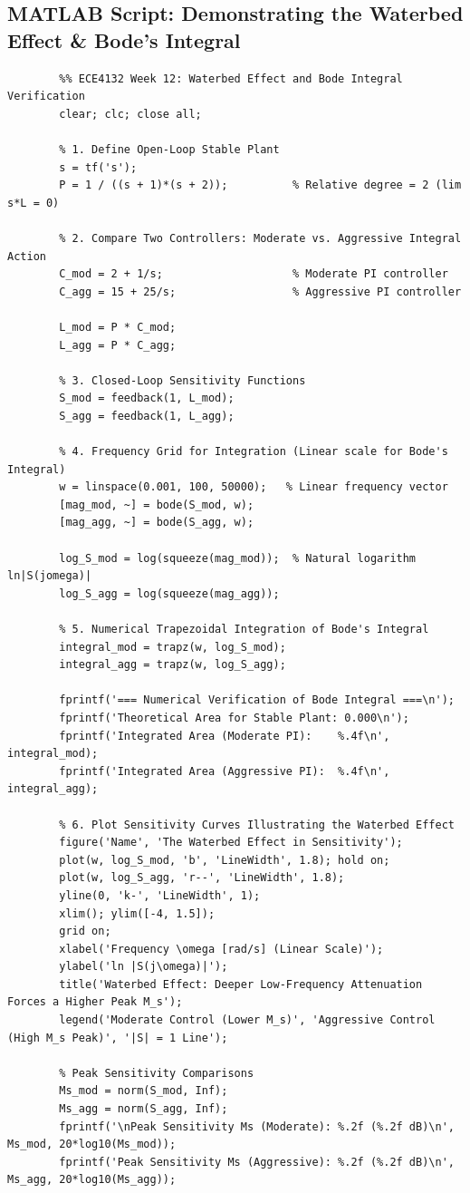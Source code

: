 \documentclass[12pt,onecolumn,twoside ]{article}
\begin{document}
	\subsection{MATLAB Script: Demonstrating the Waterbed Effect \& Bode's Integral}
	\begin{lstlisting}
		%% ECE4132 Week 12: Waterbed Effect and Bode Integral Verification
		clear; clc; close all;
		
		% 1. Define Open-Loop Stable Plant
		s = tf('s');
		P = 1 / ((s + 1)*(s + 2));          % Relative degree = 2 (lim s*L = 0)
		
		% 2. Compare Two Controllers: Moderate vs. Aggressive Integral Action
		C_mod = 2 + 1/s;                    % Moderate PI controller
		C_agg = 15 + 25/s;                  % Aggressive PI controller
		
		L_mod = P * C_mod;
		L_agg = P * C_agg;
		
		% 3. Closed-Loop Sensitivity Functions
		S_mod = feedback(1, L_mod);
		S_agg = feedback(1, L_agg);
		
		% 4. Frequency Grid for Integration (Linear scale for Bode's Integral)
		w = linspace(0.001, 100, 50000);   % Linear frequency vector
		[mag_mod, ~] = bode(S_mod, w);
		[mag_agg, ~] = bode(S_agg, w);
		
		log_S_mod = log(squeeze(mag_mod));  % Natural logarithm ln|S(jomega)|
		log_S_agg = log(squeeze(mag_agg));
		
		% 5. Numerical Trapezoidal Integration of Bode's Integral
		integral_mod = trapz(w, log_S_mod);
		integral_agg = trapz(w, log_S_agg);
		
		fprintf('=== Numerical Verification of Bode Integral ===\n');
		fprintf('Theoretical Area for Stable Plant: 0.000\n');
		fprintf('Integrated Area (Moderate PI):    %.4f\n', integral_mod);
		fprintf('Integrated Area (Aggressive PI):  %.4f\n', integral_agg);
		
		% 6. Plot Sensitivity Curves Illustrating the Waterbed Effect
		figure('Name', 'The Waterbed Effect in Sensitivity');
		plot(w, log_S_mod, 'b', 'LineWidth', 1.8); hold on;
		plot(w, log_S_agg, 'r--', 'LineWidth', 1.8);
		yline(0, 'k-', 'LineWidth', 1);
		xlim(); ylim([-4, 1.5]);
		grid on;
		xlabel('Frequency \omega [rad/s] (Linear Scale)');
		ylabel('ln |S(j\omega)|');
		title('Waterbed Effect: Deeper Low-Frequency Attenuation Forces a Higher Peak M_s');
		legend('Moderate Control (Lower M_s)', 'Aggressive Control (High M_s Peak)', '|S| = 1 Line');
		
		% Peak Sensitivity Comparisons
		Ms_mod = norm(S_mod, Inf);
		Ms_agg = norm(S_agg, Inf);
		fprintf('\nPeak Sensitivity Ms (Moderate): %.2f (%.2f dB)\n', Ms_mod, 20*log10(Ms_mod));
		fprintf('Peak Sensitivity Ms (Aggressive): %.2f (%.2f dB)\n', Ms_agg, 20*log10(Ms_agg));
	\end{lstlisting}
	
\end{document}
